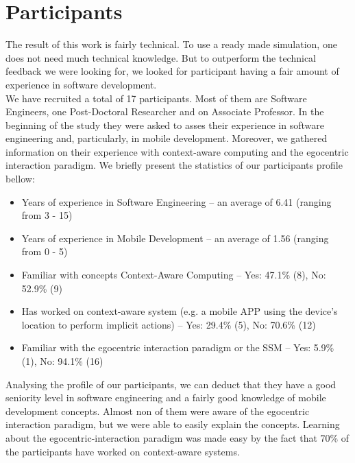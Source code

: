 \section{Participants} %
\label{sec:eval_participants}
The result of this work is fairly technical. To use a ready made simulation, one does not need much technical knowledge. But to outperform the technical feedback we were looking for, we looked for participant having a fair amount of experience in software development.\\

We have recruited a total of 17 participants. Most of them are Software Engineers, one Post-Doctoral Researcher and on Associate Professor. In the beginning of the study they were asked to asses their experience in software engineering and, particularly, in mobile development. Moreover, we gathered information on their experience with context-aware computing and the egocentric interaction paradigm. We briefly present the statistics of our participants profile bellow:
\begin{itemize}
	\item Years of experience in Software Engineering -- an average of 6.41 (ranging from 3 - 15)
	\item Years of experience in Mobile Development -- an average of 1.56 (ranging from 0 - 5)
	\item Familiar with concepts Context-Aware Computing -- Yes: 47.1\% (8), No: 52.9\% (9)
	\item Has worked on context-aware system (e.g. a mobile APP using the device's location to perform implicit actions) -- Yes: 29.4\% (5), No: 70.6\% (12)
	\item Familiar with the egocentric interaction paradigm or the SSM -- Yes: 5.9\% (1), No: 94.1\% (16)
\end{itemize}

Analysing the profile of our participants, we can deduct that they have a good seniority level in software engineering and a fairly good knowledge of mobile development concepts. Almost non of them were aware of the egocentric interaction paradigm, but we were able to easily explain the concepts. Learning about the egocentric-interaction paradigm was made easy by the fact that 70\% of the participants have worked on context-aware systems.
